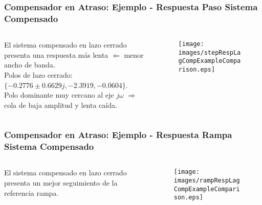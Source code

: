 \documentclass[aspectratio=169, handout]{beamer}
\theoremstyle{definition}
\theoremstyle{plain}
\theoremstyle{remark}
\begin{document}
\begin{frame}[<+->]\frametitle{Compensador en Atraso: Ejemplo - Respuesta Paso Sistema Compensado}
\begin{columns}
	\begin{column}{0.3\textwidth}
		\small
		El sistema compensado en lazo cerrado presenta una respuesta más lenta $\Leftarrow$ menor ancho de banda.\\
		\vspace*{2mm}
		\pause
		Polos de lazo cerrado: \scriptsize $\{-0.2776 \pm 0.6629j, -2.3919, -0.0604\}$.\\ 
		\vspace*{2mm}
		\pause
		\small Polo dominante muy cercano al eje $j\omega$ $\Rightarrow$ cola de baja amplitud y lenta caída.
	\end{column}
	\begin{column}{0.7\textwidth}
		\begin{figure}
			\centering
			\texttt{[image: images/stepRespLagCompExampleComparison.eps]}
		\end{figure}
	\end{column}
\end{columns}
\end{frame}

\begin{frame}[<+->]\frametitle{Compensador en Atraso: Ejemplo - Respuesta Rampa Sistema Compensado}
\vspace*{-2mm}
\begin{columns}
	\begin{column}{0.3\textwidth}
		El sistema compensado en lazo cerrado presenta un mejor seguimiento de la referencia rampa.
	\end{column}
	\begin{column}{0.7\textwidth}
		\begin{figure}
			\centering
			\texttt{[image: images/rampRespLagCompExampleComparison.eps]}
		\end{figure}
	\end{column}
\end{columns}
\end{frame}
\end{document}
